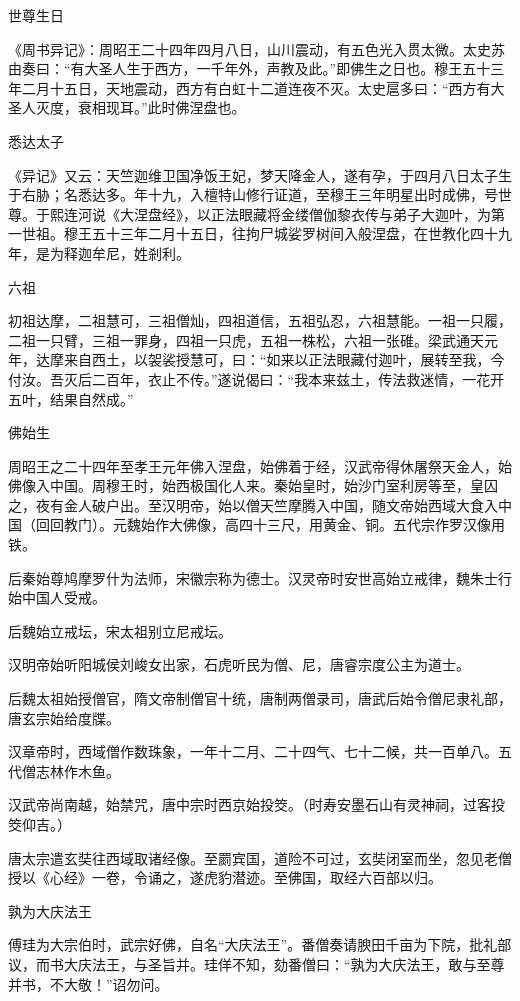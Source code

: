 \documentclass[a4paper,12pt,UTF8,twoside]{ctexbook}
\begin{document}
    世尊生日
    
    《周书异记》：周昭王二十四年四月八日，山川震动，有五色光入贯太微。太史苏由奏曰：“有大圣人生于西方，一千年外，声教及此。”即佛生之日也。穆王五十三年二月十五日，天地震动，西方有白虹十二道连夜不灭。太史扈多曰：“西方有大圣人灭度，衰相现耳。”此时佛涅盘也。
    
    悉达太子
    
    《异记》又云：天竺迦维卫国净饭王妃，梦天降金人，遂有孕，于四月八日太子生于右胁；名悉达多。年十九，入檀特山修行证道，至穆王三年明星出时成佛，号世尊。于熙连河说《大涅盘经》，以正法眼藏将金缕僧伽黎衣传与弟子大迦叶，为第一世祖。穆王五十三年二月十五日，往拘尸城娑罗树间入般涅盘，在世教化四十九年，是为释迦牟尼，姓剎利。
    
    六祖
    
    初祖达摩，二祖慧可，三祖僧灿，四祖道信，五祖弘忍，六祖慧能。一祖一只履，二祖一只臂，三祖一罪身，四祖一只虎，五祖一株松，六祖一张碓。梁武通天元年，达摩来自西土，以袈裟授慧可，曰：“如来以正法眼藏付迦叶，展转至我，今付汝。吾灭后二百年，衣止不传。”遂说偈曰：“我本来兹土，传法救迷情，一花开五叶，结果自然成。”
    
    佛始生
    
    周昭王之二十四年至孝王元年佛入涅盘，始佛着于经，汉武帝得休屠祭天金人，始佛像入中国。周穆王时，始西极国化人来。秦始皇时，始沙门室利房等至，皇囚之，夜有金人破户出。至汉明帝，始以僧天竺摩腾入中国，随文帝始西域大食入中国（回回教门）。元魏始作大佛像，高四十三尺，用黄金、铜。五代宗作罗汉像用铁。
    
    后秦始尊鸠摩罗什为法师，宋徽宗称为德士。汉灵帝时安世高始立戒律，魏朱士行始中国人受戒。
    
    后魏始立戒坛，宋太祖别立尼戒坛。
    
    汉明帝始听阳城侯刘峻女出家，石虎听民为僧、尼，唐睿宗度公主为道士。
    
    后魏太祖始授僧官，隋文帝制僧官十统，唐制两僧录司，唐武后始令僧尼隶礼部，唐玄宗始给度牒。
    
    汉章帝时，西域僧作数珠象，一年十二月、二十四气、七十二候，共一百单八。五代僧志林作木鱼。
    
    汉武帝尚南越，始禁咒，唐中宗时西京始投筊。（时寿安墨石山有灵神祠，过客投筊仰吉。）
    
    唐太宗遣玄奘往西域取诸经像。至罽宾国，道险不可过，玄奘闭室而坐，忽见老僧授以《心经》一卷，令诵之，遂虎豹潜迹。至佛国，取经六百部以归。
    
    孰为大庆法王
    
    傅珪为大宗伯时，武宗好佛，自名“大庆法王”。番僧奏请腴田千亩为下院，批礼部议，而书大庆法王，与圣旨并。珪佯不知，劾番僧曰：“孰为大庆法王，敢与至尊并书，不大敬！”诏勿问。
    
\end{document}
